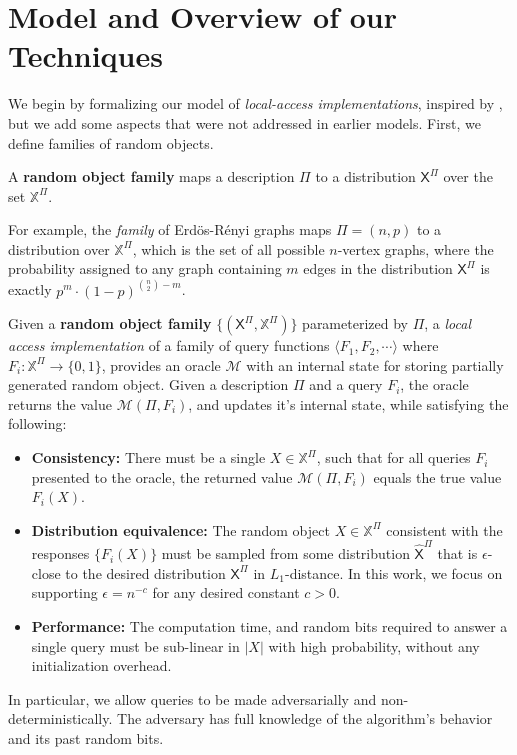 \section{Model and Overview of our Techniques}
\label{sec:overview_of_our_techniques}
We begin by formalizing our model of \emph{local-access implementations}, inspired by \cite{reut},
but we add some aspects that were not addressed in earlier models.
First, we define families of random objects.

\begin{definition}
\label{def:parametrized_random_object}
A \textbf{random object family} maps a description $\Pi$ to a distribution $\mathsf X^{\Pi}$ over the set $\mathbb X^{\Pi}$.
\end{definition}
For example, the \emph{family} of Erd\"{o}s-R\'{e}nyi graphs maps $\Pi = (n, p)$ to a distribution over $\mathbb X^{\Pi}$,
which is the set of all possible $n$-vertex graphs,
where the probability assigned to any graph containing $m$ edges in the distribution $\mathsf X^{\Pi}$ is exactly $p^m\cdot (1-p)^{\binom{n}{2}-m}$.

\begin{definition}
\label{def:local_access}
Given a \textbf{random object family} $\{(\mathsf X^{\Pi}, \mathbb X^{\Pi})\}$ parameterized by $\Pi$, a \emph{local access implementation}
of a family of query functions $\langle F_1, F_2,\cdots \rangle$ where $F_i: \mathbb X^{\Pi}\rightarrow \{0,1\}$,
provides an oracle $\mathcal M$ with an internal state for storing partially generated random object.
Given a description $\Pi$ and a query $F_i$, the oracle returns the value $\mathcal M(\Pi, F_i)$,
and updates it's internal state, while satisfying the following:
\begin{itemize}
    \item \textbf{Consistency:}
    There must be a single $X\in \mathbb X^{\Pi}$, such that for all queries $F_i$ presented to the oracle,
    the returned value $\mathcal M(\Pi,F_i)$ equals the true value $F_i(X)$.
    \item \textbf{Distribution equivalence:}
    The random object $X\in \mathbb X^{\Pi}$ consistent with the responses $\{ F_i(X)\}$ must be sampled from some distribution $\hat{\mathsf{X}}^{\Pi}$
    that is $\epsilon$-close to the desired distribution $\mathsf{X}^{\Pi}$ in $L_1$-distance.
    In this work, we focus on supporting $\epsilon = n^{-c}$ for any desired constant $c>0$.
    \item \textbf{Performance:}
    The computation time, and random bits required to answer a single query must be sub-linear in $|X|$ with high probability,
    without any initialization overhead.
\end{itemize}
In particular, we allow queries to be made adversarially and non-deterministically.
The adversary has full knowledge of the algorithm's behavior and its past random bits.
\end{definition}

